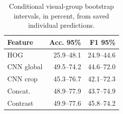\begin{table}[t]
\centering\small
\begin{tabular}{lrr}
\toprule
Feature & Acc. 95\% & F1 95\% \\
\midrule
HOG & 25.9--48.1 & 24.9--44.6 \\
CNN global & 49.5--74.2 & 44.6--72.0 \\
CNN crop & 45.3--76.7 & 42.1--72.3 \\
Concat. & 48.9--77.9 & 43.7--74.9 \\
Contrast & 49.9--77.6 & 45.8--74.2 \\
\bottomrule
\end{tabular}
\caption{Conditional visual-group bootstrap intervals, in percent, from saved individual predictions.}
\label{tab:intervals}
\end{table}
